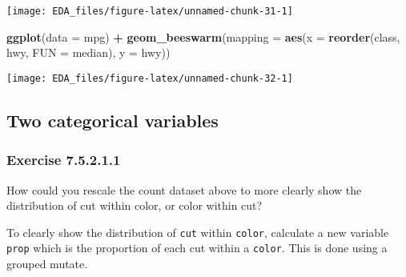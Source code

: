 \documentclass[]{book}
\newenvironment{Shaded}{\begin{snugshade}}{\end{snugshade}}
\newcommand{\DataTypeTok}[1]{\textcolor[rgb]{0.13,0.29,0.53}{#1}}
\newcommand{\KeywordTok}[1]{\textcolor[rgb]{0.13,0.29,0.53}{\textbf{#1}}}
\newcommand{\NormalTok}[1]{#1}
\newcommand{\OperatorTok}[1]{\textcolor[rgb]{0.81,0.36,0.00}{\textbf{#1}}}
\newcommand{\StringTok}[1]{\textcolor[rgb]{0.31,0.60,0.02}{#1}}
\theoremstyle{plain}
\theoremstyle{remark}
\begin{document}
\begin{center}\texttt{[image: EDA\_files/figure-latex/unnamed-chunk-31-1]} \end{center}

\begin{Shaded}
\begin{Highlighting}[]
\KeywordTok{ggplot}\NormalTok{(}\DataTypeTok{data =}\NormalTok{ mpg) }\OperatorTok{+}
\StringTok{  }\KeywordTok{geom_beeswarm}\NormalTok{(}\DataTypeTok{mapping =} \KeywordTok{aes}\NormalTok{(}\DataTypeTok{x =} \KeywordTok{reorder}\NormalTok{(class, hwy, }\DataTypeTok{FUN =}\NormalTok{ median),}
                                 \DataTypeTok{y =}\NormalTok{ hwy))}
\end{Highlighting}
\end{Shaded}

\begin{center}\texttt{[image: EDA\_files/figure-latex/unnamed-chunk-32-1]} \end{center}

\hypertarget{two-categorical-variables}{%
\subsection{Two categorical variables}\label{two-categorical-variables}}

\hypertarget{exercise-7.5.2.1.1}{%
\subsubsection*{\texorpdfstring{Exercise
{7.5.2.1.1}}{Exercise 7.5.2.1.1}}\label{exercise-7.5.2.1.1}}

How could you rescale the count dataset above to more clearly show the
distribution of cut within color, or color within cut?

To clearly show the distribution of \texttt{cut} within \texttt{color},
calculate a new variable \texttt{prop} which is the proportion of each
cut within a \texttt{color}. This is done using a grouped mutate.
\end{document}
